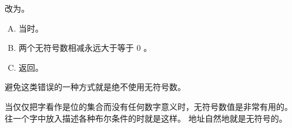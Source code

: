 {{        %
        \begin{practicec}
            改为。
        \end{practicec}

        \begin{practicec}
            \begin{enumerate}[A.]
                \item 当时。
                \item 两个无符号数相减永远大于等于 $0$ 。
                \item 返回。
            \end{enumerate}
        \end{practicec}

        避免这类错误的一种方式就是绝不使用无符号数。

        当仅仅把字看作是位的集合而没有任何数字意义时，无符号数值是非常有用的。
        往一个字中放入描述各种布尔条件的时就是这样。
        地址自然地就是无符号的。
    }
}
